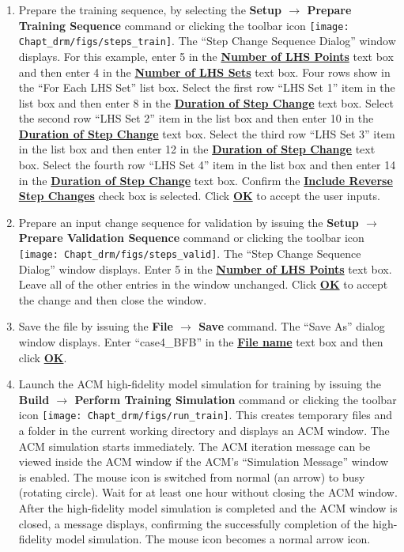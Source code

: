 \begin{enumerate}
	\item Prepare the training sequence, by selecting the \textbf{Setup $\rightarrow$ Prepare Training Sequence} command or clicking the toolbar icon \texttt{[image: Chapt\_drm/figs/steps\_train]}.  The ``Step Change Sequence Dialog'' window displays.  For this example, enter 5 in the \textbf{\underline{Number of LHS Points}} text box and then enter 4 in the \textbf\underline{{Number of LHS Sets}} text box.  Four rows show in the ``For Each LHS Set'' list box.  Select the first row ``LHS Set 1'' item in the list box and then enter 8 in the \textbf{\underline{Duration of Step Change}} text box.  Select the second row ``LHS Set 2'' item in the list box and then enter 10 in the \textbf{\underline{Duration of Step Change}} text box.  Select the third row ``LHS Set 3'' item in the list box and then enter 12 in the \textbf{\underline{Duration of Step Change}} text box.  Select the fourth row ``LHS Set 4'' item in the list box and then enter 14 in the \textbf{\underline{Duration of Step Change}} text box.  Confirm the \textbf{\underline{Include Reverse Step Changes}} check box is selected.  Click \textbf{\underline{OK}} to accept the user inputs.
	\item Prepare an input change sequence for validation by issuing the \textbf{Setup $\rightarrow$ Prepare Validation Sequence} command or clicking the toolbar icon \texttt{[image: Chapt\_drm/figs/steps\_valid]}.  The ``Step Change Sequence Dialog'' window displays.  Enter 5 in the \textbf{\underline{Number of LHS Points}} text box.  Leave all of the other entries in the window unchanged.  Click \textbf{\underline{OK}} to accept the change and then close the window.
	\item Save the file by issuing the \textbf{File $\rightarrow$ Save} command.  The ``Save As'' dialog window displays.  Enter ``case4\_BFB'' in the \textbf{\underline{File name}} text box and then click \textbf{\underline{OK}}.
	\item Launch the ACM high-fidelity model simulation for training by issuing the \textbf{Build $\rightarrow$ Perform Training Simulation} command or clicking the toolbar icon \texttt{[image: Chapt\_drm/figs/run\_train]}.  This creates temporary files and a folder in the current working directory and displays an ACM window.  The ACM simulation starts immediately.  The ACM iteration message can be viewed inside the ACM window if the ACM’s ``Simulation Message'' window is enabled.  The mouse icon is switched from normal (an arrow) to busy (rotating circle).  Wait for at least one hour without closing the ACM window.  After the high-fidelity model simulation is completed and the ACM window is closed, a message displays, confirming the successfully completion of the high-fidelity model simulation.  The mouse icon becomes a normal arrow icon.

\end{enumerate}
